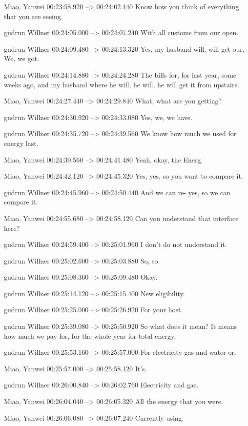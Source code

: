 {Miao, Yanwei 00:23:58.920 --> 00:24:02.440
Know how you think of everything that you are seeing.

gudrun Willner 00:24:05.000 --> 00:24:07.240
With all customs from our open.

gudrun Willner 00:24:09.480 --> 00:24:13.320
Yes, my husband will, will get our, We, we got.

gudrun Willner 00:24:14.880 --> 00:24:24.280
The bills for, for last year, some weeks ago, and my husband where he will, he will, he will get it from upstairs.

Miao, Yanwei 00:24:27.440 --> 00:24:29.840
What, what are you getting?

gudrun Willner 00:24:30.920 --> 00:24:33.080
Yes, we, we have.

gudrun Willner 00:24:35.720 --> 00:24:39.560
We know how much we used for energy last.

Miao, Yanwei 00:24:39.560 --> 00:24:41.480
Yeah, okay, the Energ.

Miao, Yanwei 00:24:42.120 --> 00:24:45.320
Yes, yes, so you want to compare it.

gudrun Willner 00:24:45.960 --> 00:24:50.440
And we can re- yes, so we can compare it.

Miao, Yanwei 00:24:55.680 --> 00:24:58.120
Can you understand that interface here?

gudrun Willner 00:24:59.400 --> 00:25:01.960
I don't do not understand it.

gudrun Willner 00:25:02.600 --> 00:25:03.880
So, so.

gudrun Willner 00:25:08.360 --> 00:25:09.480
Okay.

gudrun Willner 00:25:14.120 --> 00:25:15.400
New eligibility.

gudrun Willner 00:25:25.000 --> 00:25:26.920
For your host.

gudrun Willner 00:25:39.080 --> 00:25:50.920
So what does it mean? It means how much we pay for, for the whole year for total energy.

gudrun Willner 00:25:53.160 --> 00:25:57.000
For electricity gas and water or.

Miao, Yanwei 00:25:57.000 --> 00:25:58.120
It's.

gudrun Willner 00:26:00.840 --> 00:26:02.760
Electricity and gas.

Miao, Yanwei 00:26:04.040 --> 00:26:05.320
All the energy that you were.

Miao, Yanwei 00:26:06.080 --> 00:26:07.240
Currently using.

}
